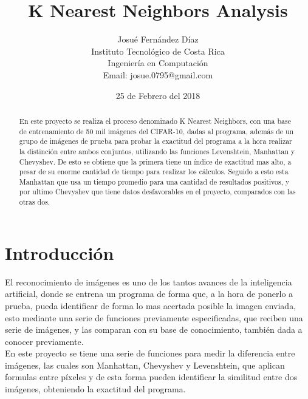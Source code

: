 \documentclass{article}
\title{K Nearest Neighbors Analysis}
\author{Josué Fernández Díaz\\
Instituto Tecnológico de Costa Rica\\
Ingeniería en Computación\\
Email: josue.0795@gmail.com}
\date{25 de Febrero del 2018}
\begin{document}
\maketitle

\begin{abstract}
    En este proyecto se realiza el proceso denominado K Nearest Neighbors, con una base de entrenamiento de 50 mil imágenes del CIFAR-10, dadas al programa, además de un grupo de imágenes de prueba para probar la exactitud del programa a la hora realizar la distinción entre ambos conjuntos, utilizando las funciones Levenshtein, Manhattan y Chevyshev. De esto se obtiene que la primera tiene un índice de exactitud mas alto, a pesar de su enorme cantidad de tiempo para realizar los cálculos. Seguido a esto esta Manhattan que usa un tiempo promedio para una cantidad de resultados positivos, y por ultimo Chevyshev que tiene datos desfavorables en el proyecto, comparados con las otras dos.
\end{abstract}

\section{Introducción}
El reconocimiento de imágenes es uno de los tantos avances de la inteligencia artificial, donde se entrena un programa de forma que, a la hora de ponerlo a prueba, pueda identificar de forma lo mas acertada posible la imagen enviada, esto mediante una serie de funciones previamente especificadas, que reciben una serie de imágenes, y las comparan con su base de conocimiento, también dada a conocer previamente. \\En este proyecto se tiene una serie de funciones para medir la diferencia entre imágenes, las cuales son Manhattan\cite{manhattan}, Chevyshev\cite{chevyshev} y Levenshtein\cite{levenshtein}, que aplican formulas entre píxeles y de esta forma pueden identificar la similitud entre dos imágenes, obteniendo la exactitud del programa.
\end{document}
